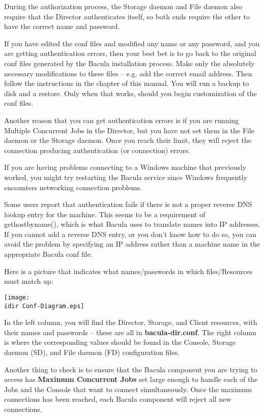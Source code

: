 \begin{description}
   During the authorization process, the Storage daemon and File daemon
   also require that the Director authenticates itself, so both ends
   require the other to have the correct name and password.

   If you have edited the conf files and modified any name or any password,
   and you are getting authentication errors, then your best bet is to go
   back to the original conf files generated by the Bacula installation
   process.  Make only the absolutely necessary modifications to these
   files -- e.g.  add the correct email address.  Then follow the
   instructions in the  chapter of
   this manual.  You will run a backup to disk and a restore.  Only when
   that works, should you begin customization of the conf files.

   Another reason that you can get authentication errors is if you are
   running Multiple Concurrent Jobs in the Director, but you have not set
   them in the File daemon or the Storage daemon.  Once you reach their
   limit, they will reject the connection producing authentication (or
   connection) errors.

   If you are having problems connecting to a Windows machine that
   previously worked, you might try restarting the Bacula service since
   Windows frequently encounters networking connection problems.

   Some users report that authentication fails if there is not a proper
   reverse DNS lookup entry for the machine.  This seems to be a
   requirement of gethostbyname(), which is what Bacula uses to translate
   names into IP addresses.  If you cannot add a reverse DNS entry, or you
   don't know how to do so, you can avoid the problem by specifying an IP
   address rather than a machine name in the appropriate Bacula conf file.

   Here is a picture that indicates what names/passwords in which
   files/Resources must match up:

   \texttt{[image: \\idir Conf-Diagram.eps]}

   In the left column, you will find the Director, Storage, and  Client
   resources, with their names and passwords -- these  are all in {\bf
   bacula-dir.conf}. The right column is where the corresponding values
   should be found in the  Console, Storage daemon (SD), and File daemon (FD)
   configuration  files.

   Another thing to check is to ensure that the Bacula component you are
   trying to access has {\bf Maximum Concurrent Jobs} set large enough to
   handle each of the Jobs and the Console that want to connect
   simultaneously.  Once the maximum connections has been reached, each
   Bacula component will reject all new connections.


\end{description}

